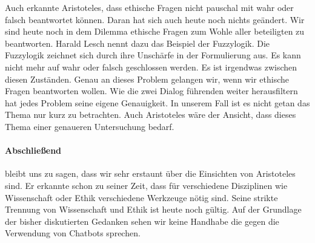 Auch erkannte Aristoteles, dass ethische Fragen nicht pauschal mit wahr oder falsch beantwortet können. Daran hat sich auch heute noch nichts geändert. Wir sind heute noch in dem Dilemma ethische Fragen zum Wohle aller beteiligten zu beantworten. Harald Lesch nennt dazu das Beispiel der Fuzzylogik. Die Fuzzylogik zeichnet sich durch ihre Unschärfe in der Formulierung aus. Es kann nicht mehr auf wahr oder falsch geschlossen werden. Es ist irgendwas zwischen diesen Zuständen. Genau an dieses Problem gelangen wir, wenn wir ethische Fragen beantworten wollen. \newline
Wie die zwei Dialog führenden weiter herausfiltern hat jedes Problem seine eigene Genauigkeit. In unserem Fall ist es nicht getan das Thema nur kurz zu betrachten. Auch Aristoteles wäre der Ansicht, dass dieses Thema einer genaueren Untersuchung bedarf.

\paragraph{Abschließend} bleibt uns zu sagen, dass wir sehr erstaunt über die Einsichten von Aristoteles sind. Er erkannte schon zu seiner Zeit, dass für verschiedene Disziplinen wie Wissenschaft oder Ethik verschiedene Werkzeuge nötig sind. Seine strikte Trennung von Wissenschaft und Ethik ist heute noch gültig. Auf der Grundlage der bisher diskutierten Gedanken sehen wir keine Handhabe die gegen die Verwendung von Chatbots sprechen. 

